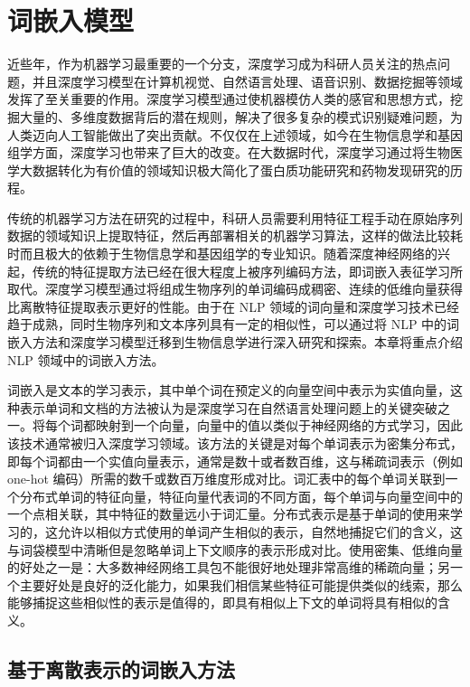 
\chapter{词嵌入模型}

近些年，作为机器学习最重要的一个分支，深度学习成为科研人员关注的热点问题，并且深度学习模型在计算机视觉、自然语言处理、语音识别、数据挖掘等领域发挥了至关重要的作用。深度学习模型通过使机器模仿人类的感官和思想方式，挖掘大量的、多维度数据背后的潜在规则，解决了很多复杂的模式识别疑难问题，为人类迈向人工智能做出了突出贡献。不仅仅在上述领域，如今在生物信息学和基因组学方面，深度学习也带来了巨大的改变。在大数据时代，深度学习通过将生物医学大数据转化为有价值的领域知识极大简化了蛋白质功能研究和药物发现研究的历程。

传统的机器学习方法在研究的过程中，科研人员需要利用特征工程手动在原始序列数据的领域知识上提取特征，然后再部署相关的机器学习算法，这样的做法比较耗时而且极大的依赖于生物信息学和基因组学的专业知识。随着深度神经网络的兴起，传统的特征提取方法已经在很大程度上被序列编码方法，即词嵌入表征学习所取代。深度学习模型通过将组成生物序列的单词编码成稠密、连续的低维向量获得比离散特征提取表示更好的性能。由于在 NLP 领域的词向量和深度学习技术已经趋于成熟，同时生物序列和文本序列具有一定的相似性，可以通过将 NLP 中的词嵌入方法和深度学习模型迁移到生物信息学进行深入研究和探索。本章将重点介绍 NLP 领域中的词嵌入方法。

词嵌入是文本的学习表示，其中单个词在预定义的向量空间中表示为实值向量，这种表示单词和文档的方法被认为是深度学习在自然语言处理问题上的关键突破之一。将每个词都映射到一个向量，向量中的值以类似于神经网络的方式学习，因此该技术通常被归入深度学习领域。该方法的关键是对每个单词表示为密集分布式，即每个词都由一个实值向量表示，通常是数十或者数百维，这与稀疏词表示（例如 one-hot 编码）所需的数千或数百万维度形成对比。词汇表中的每个单词关联到一个分布式单词的特征向量，特征向量代表词的不同方面，每个单词与向量空间中的一个点相关联，其中特征的数量远小于词汇量。分布式表示是基于单词的使用来学习的，这允许以相似方式使用的单词产生相似的表示，自然地捕捉它们的含义，这与词袋模型中清晰但是忽略单词上下文顺序的表示形成对比。使用密集、低维向量的好处之一是：大多数神经网络工具包不能很好地处理非常高维的稀疏向量；另一个主要好处是良好的泛化能力，如果我们相信某些特征可能提供类似的线索，那么能够捕捉这些相似性的表示是值得的，即具有相似上下文的单词将具有相似的含义。

\section{基于离散表示的词嵌入方法}
